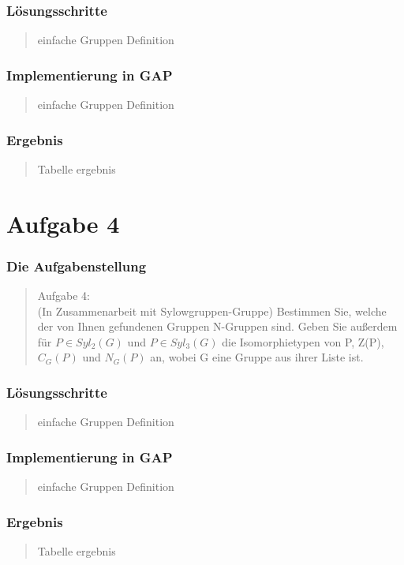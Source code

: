 \documentclass{beamer}
\begin{document}
\begin{frame}
	\frametitle{Lösungsschritte}
	\begin{quote}
	 einfache Gruppen Definition
		 
	\end{quote}
\end{frame}

\begin{frame}
	\frametitle{Implementierung in GAP}
	\begin{quote}
	 einfache Gruppen Definition
		 
	\end{quote}
\end{frame}

\begin{frame}
	\frametitle{Ergebnis}
	\begin{quote}
	 Tabelle ergebnis
		 
	\end{quote}
\end{frame}

\section{Aufgabe 4}

\begin{frame}
	\frametitle{Die Aufgabenstellung}
	\begin{quote}
	Aufgabe 4:\\
	(In Zusammenarbeit mit Sylowgruppen-Gruppe) Bestimmen Sie, welche der von Ihnen gefundenen Gruppen N-Gruppen sind. Geben Sie außerdem für 
	$ P \in Syl_2(G) $ und $ P \in Syl_3(G) $ die Isomorphietypen von P, Z(P), $ C_G(P) $ und $ N_G(P) $ an, wobei G eine Gruppe aus ihrer Liste ist.
	\end{quote}
\end{frame}

\begin{frame}
	\frametitle{Lösungsschritte}
	\begin{quote}
	 einfache Gruppen Definition
		 
	\end{quote}
\end{frame}

\begin{frame}
	\frametitle{Implementierung in GAP}
	\begin{quote}
	 einfache Gruppen Definition
		 
	\end{quote}
\end{frame}

\begin{frame}
	\frametitle{Ergebnis}
	\begin{quote}
	 Tabelle ergebnis
		 
	\end{quote}
\end{frame}
\end{document}
